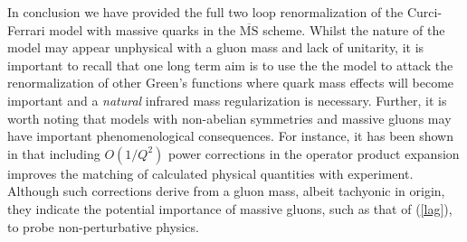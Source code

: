 \documentclass[a4paper,11pt]{article}
\newcommand{\MSbar}{\overline{\mbox{MS}}}
\begin{document}
In conclusion we have provided the full two loop renormalization of the 
Curci-Ferrari model with massive quarks in the $\MSbar$ scheme. Whilst the 
nature of the model may appear unphysical with a gluon mass and lack of 
unitarity, it is important to recall that one long term aim is to use the the 
model to attack the renormalization of other Green's functions where quark mass
effects will become important and a {\em natural} infrared mass regularization 
is necessary. Further, it is worth noting that models with non-abelian 
symmetries and massive gluons may have important phenomenological consequences.
For instance, it has been shown in \cite{33} that including $O(1/Q^2)$ power 
corrections in the operator product expansion improves the matching of 
calculated physical quantities with experiment. Although such corrections 
derive from a gluon mass, albeit tachyonic in origin, they indicate the 
potential importance of massive gluons, such as that of (\ref{lag}), to probe 
non-perturbative physics.  
\end{document}
